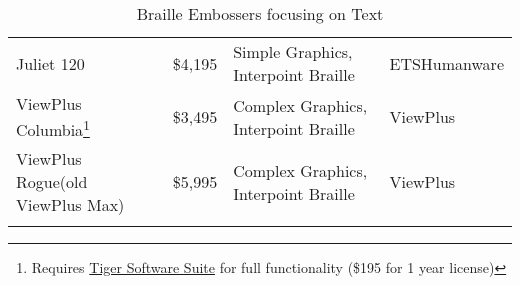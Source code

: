 \begin{longtable}[]{@{}
	>{\raggedright\arraybackslash}m{}
	>{\raggedright\arraybackslash}m{}
	>{\raggedright\arraybackslash}m{}
	>{\raggedright\arraybackslash}b{}@{}
	}
	Juliet 120                                                                                                                                                                          & \$4,195\footnotemark[2]                                                                                                                                                           & Simple Graphics, Interpoint Braille  & ETS\break Humanware     \\ \cdashline{1-4}
	ViewPlus Columbia\footnote{\raggedright Requires \href{http://viewplus.com/product/tiger-software-suite8/}{Tiger Software Suite} for full functionality (\$195 for 1 year license)} & \$3,495                                                                                                                                                                           & Complex Graphics, Interpoint Braille & ViewPlus                \\ \cdashline{1-4}
	ViewPlus Rogue\break (old ViewPlus Max)\footnotemark[\value{footnote}]                                                                                                                & \$5,995                                                                                                                                                                           & Complex Graphics, Interpoint Braille & ViewPlus                \\[1.0em]\hline
	\caption[ Braille Embossers focusing on Text]{ Braille Embossers focusing on Text}\label{tab:table16}
\end{longtable}\clearpage


